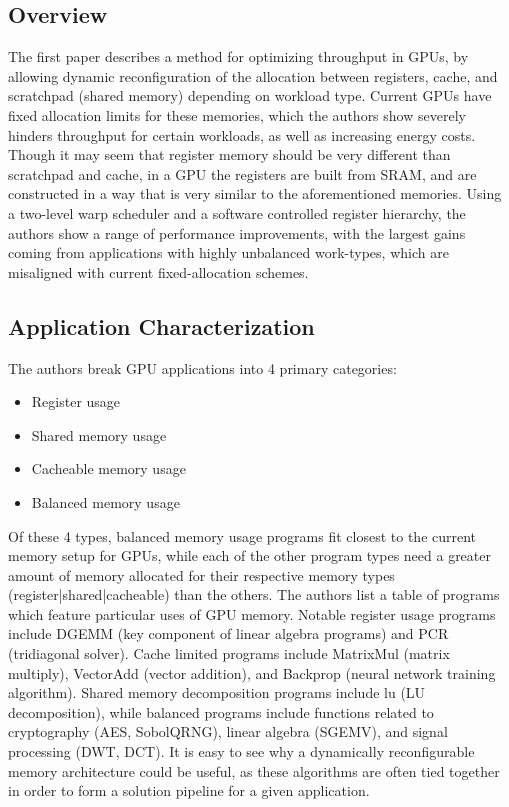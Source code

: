 \documentclass[conference]{IEEEtran}
\begin{document}
\subsection{Overview}
The first paper \cite{throughput} describes a method for optimizing throughput 
in GPUs, by allowing dynamic reconfiguration of the allocation between
registers, cache, and scratchpad (shared memory) depending on workload type.
Current GPUs have fixed allocation limits for these memories, which the authors
show severely hinders throughput for certain workloads, as well as increasing 
energy costs. Though it may seem that register memory should be very different
than scratchpad and cache, in a GPU the registers are built from SRAM, and are
constructed in a way that is very similar to the aforementioned memories. Using
a two-level warp scheduler and a software controlled register hierarchy, the
authors show a range of performance improvements, with the largest gains coming
from applications with highly unbalanced work-types, which are misaligned with
current fixed-allocation schemes. 

\subsection{Application Characterization}
The authors break GPU applications into 4 primary categories:
\begin{itemize}
    \item Register usage
    \item Shared memory usage
    \item Cacheable memory usage
    \item Balanced memory usage
\end{itemize}
Of these 4 types, balanced memory usage programs fit closest to the current
memory setup for GPUs, while each of the other program types need a greater
amount of memory allocated for their respective memory types 
(register|shared|cacheable) than the others. The authors list a table of 
programs which feature particular uses of GPU memory.
Notable register usage programs include DGEMM (key component of linear 
algebra programs) and PCR (tridiagonal solver). Cache limited programs
include MatrixMul (matrix multiply), VectorAdd (vector addition), and Backprop
(neural network training algorithm). Shared memory decomposition programs 
include lu (LU decomposition), while balanced programs include functions 
related to cryptography (AES, SobolQRNG), linear algebra (SGEMV), and signal
processing (DWT, DCT). It is easy to see why a dynamically reconfigurable
memory architecture could be useful, as these algorithms are often tied 
together in order to form a solution pipeline for a given application.
\end{document}
